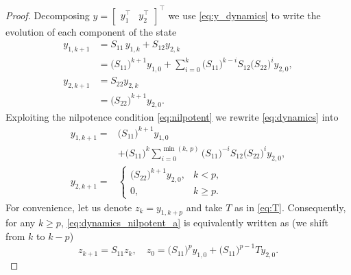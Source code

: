 \documentclass[journal,twoside,web]{ieeecolor}
\newcommand{\bbm}{\begin{bmatrix}}
\newcommand{\ebm}{\end{bmatrix}}
\newcommand{\bbm}{\begin{bmatrix}}
\newcommand{\ebm}{\end{bmatrix}}
\begin{document}
\begin{proof}
Decomposing $y=\bbm y_1^\top & y_2^\top \ebm^\top$ we use \eqref{eq:y_dynamics} to write the evolution of each component of the state
\begin{subequations}
\label{eq:dynamics}
    \begin{align}
        \nonumber y_{1, k+1} &= S_{11}\,y_{1, k} + S_{12}y_{2, k}\\
        &=\bigl(S_{11}\bigr)^{k+1}y_{1,0}+\sum\limits_{i=0}^k \bigl(S_{11}\bigr)^{k-i}S_{12}\bigl(S_{22}\bigr)^{i}y_{2,0},\\
        \nonumber y_{2, k+1} &= S_{22}y_{2, k}\\
        &=\bigl(S_{22}\bigr)^{k+1}y_{2,0}.
    \end{align}
\end{subequations}
Exploiting the nilpotence condition \eqref{eq:nilpotent} we rewrite \eqref{eq:dynamics} into
\begin{subequations}
\label{eq:dynamics_nilpotent}
    \begin{align}
        \nonumber y_{1, k+1} =&  \bigl(S_{11}\bigr)^{k+1}y_{1,0}\\
        &+          \label{eq:dynamics_nilpotent_a}\bigl(S_{11}\bigr)^{k}\sum\limits_{i=0}^{\min(k,\, p)} \bigl(S_{11}\bigr)^{-i}S_{12}\bigl(S_{22}\bigr)^{i}y_{2,0},\\
        \label{eq:dynamics_nilpotent_b}y_{2, k+1} =& \begin{cases}\bigl(S_{22}\bigr)^{k+1}y_{2,0}, & k<p,\\
        0, & k\geq p.
        \end{cases}
    \end{align}
\end{subequations}
For convenience, let us denote $z_k=y_{1,k+p}$ and take $T$ as in \eqref{eq:T}. Consequently, for any $k\geq p$, \eqref{eq:dynamics_nilpotent_a} is equivalently written as (we shift from $k$ to $k-p$)
\begin{equation}
\label{eq:z}
    z_{k+1} = S_{11} z_k, \quad z_0=\bigl(S_{11}\bigr)^py_{1,0}+\bigl(S_{11}\bigr)^{p-1}Ty_{2,0}.
\end{equation}


\end{proof}
\end{document}
